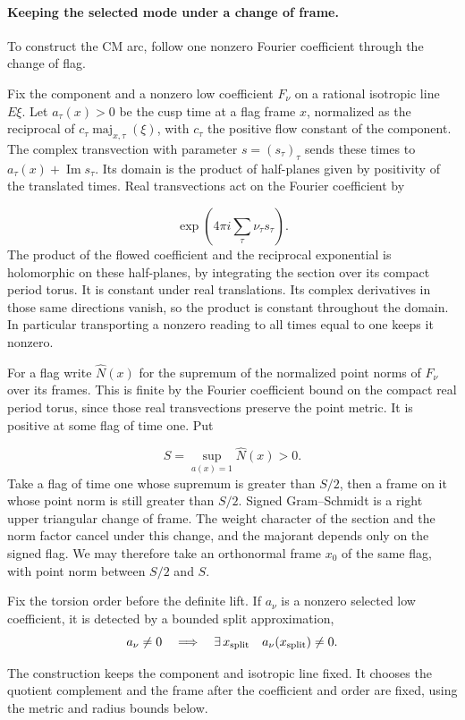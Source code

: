 \paragraph{Keeping the selected mode under a change of frame.}

To construct the CM arc, follow one nonzero Fourier coefficient through the change of flag.

Fix the component and a nonzero low coefficient \(F_\nu\) on a
rational isotropic line \(E\xi\). Let \(a_\tau(x)>0\) be the
cusp time at a flag frame \(x\), normalized as the reciprocal of
\(c_\tau\operatorname{maj}_{x,\tau}(\xi)\), with \(c_\tau\) the
positive flow constant of the component. The complex transvection
with parameter \(s=(s_\tau)_\tau\) sends these times to
\(a_\tau(x)+\operatorname{Im}s_\tau\). Its domain is the product
of half-planes given by positivity of the translated times.
Real transvections act on the Fourier coefficient by

\[
  \exp(4\pi i\sum_\tau\nu_\tau s_\tau).
\]
The product of the flowed coefficient and the reciprocal
exponential is holomorphic on these half-planes, by integrating
the section over its compact period torus. It is constant under
real translations. Its complex derivatives in those same
directions vanish, so the product is constant throughout the
domain. In particular transporting a nonzero reading to all
times equal to one keeps it nonzero.

For a flag write \(\widehat N(x)\) for the supremum of the
normalized point norms of \(F_\nu\) over its frames. This is
finite by the Fourier coefficient bound on the compact real
period torus, since those real transvections preserve the point
metric. It is positive at some flag of time one. Put

\[
  S=\sup_{a(x)=1}\widehat N(x)>0.
\]
 Take a flag of time one
whose supremum is greater than \(S/2\), then a frame on it
whose point norm is still greater than \(S/2\).
Signed Gram--Schmidt is a right upper triangular change of frame.
The weight character of the section and the norm factor cancel
under this change, and the majorant depends only on the signed
flag. We may therefore take an orthonormal frame \(x_0\) of the
same flag, with point norm between \(S/2\) and \(S\).

\begin{proposition}
\label{prop:split-frame-low-mode}
Fix the torsion order before the definite lift. If \(a_\nu\) is a nonzero selected low coefficient, it is detected by a bounded split approximation,
\[
 a_\nu\ne0\quad\Longrightarrow\quad \exists\,x_{\rm split}\quad a_\nu(x_{\rm split})\ne0.
\]

The construction keeps the component and isotropic line fixed.
It chooses the quotient complement and the frame after the coefficient
and order are fixed, using the metric and radius bounds below.
\end{proposition}

